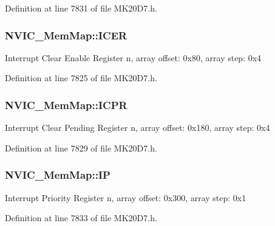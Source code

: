 Definition at line 7831 of file M\+K20\+D7.\+h.

\subsubsection[{\texorpdfstring{I\+C\+ER}{ICER}}]{ N\+V\+I\+C\+\_\+\+Mem\+Map\+::\+I\+C\+ER}\hypertarget{struct_n_v_i_c___mem_map_adf6a31dee8a4805e4ed8d0ad170e6119}{}\label{struct_n_v_i_c___mem_map_adf6a31dee8a4805e4ed8d0ad170e6119}
Interrupt Clear Enable Register n, array offset\+: 0x80, array step\+: 0x4 

Definition at line 7825 of file M\+K20\+D7.\+h.

\subsubsection[{\texorpdfstring{I\+C\+PR}{ICPR}}]{ N\+V\+I\+C\+\_\+\+Mem\+Map\+::\+I\+C\+PR}\hypertarget{struct_n_v_i_c___mem_map_a279595dd8a9e560f6e4e8948a2e52a97}{}\label{struct_n_v_i_c___mem_map_a279595dd8a9e560f6e4e8948a2e52a97}
Interrupt Clear Pending Register n, array offset\+: 0x180, array step\+: 0x4 

Definition at line 7829 of file M\+K20\+D7.\+h.

\subsubsection[{\texorpdfstring{IP}{IP}}]{ N\+V\+I\+C\+\_\+\+Mem\+Map\+::\+IP}\hypertarget{struct_n_v_i_c___mem_map_a8b35c83a4683fabecb9bd8423640599f}{}\label{struct_n_v_i_c___mem_map_a8b35c83a4683fabecb9bd8423640599f}
Interrupt Priority Register n, array offset\+: 0x300, array step\+: 0x1 

Definition at line 7833 of file M\+K20\+D7.\+h.

